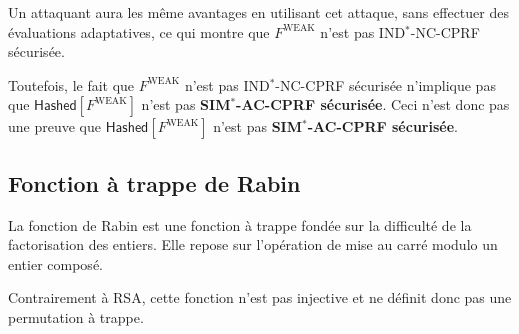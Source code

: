 \documentclass[9pt]{extarticle}
\begin{document}
\begin{itemize}
Un attaquant aura les même avantages en utilisant cet attaque, sans effectuer des évaluations adaptatives, ce qui montre que $F^{\text{WEAK}}$ n'est pas IND$^*$-NC-CPRF sécurisée.

\end{itemize}

Toutefois, le fait que $F^{\text{WEAK}}$ n'est pas IND$^*$-NC-CPRF sécurisée n'implique pas que $\textsf{Hashed}[F^{\text{WEAK}}]$ n'est pas \textbf{SIM$^*$-AC-CPRF sécurisée}. Ceci n'est donc pas une preuve que $\textsf{Hashed}[F^{\text{WEAK}}]$ n'est pas \textbf{SIM$^*$-AC-CPRF sécurisée}.

\subsection{Fonction à trappe de Rabin}

La fonction de Rabin est une fonction à trappe fondée sur la difficulté
de la factorisation des entiers. Elle repose sur l’opération de mise au carré
modulo un entier composé.

Contrairement à RSA, cette fonction n’est pas injective et ne définit donc
pas une permutation à trappe.
\end{document}
